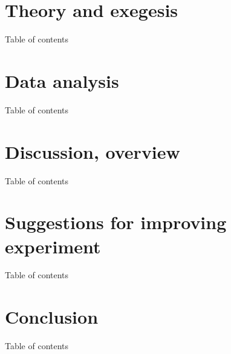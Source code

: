 \documentclass[a4paper]{beamer}
\begin{document}
	\section{Theory and exegesis}\label{sec:theory-and-exegesis}
	\begin{frame}{Table of contents}
		\tableofcontents[currentsection]
	\end{frame}
	\begin{frame}{}

	\end{frame}


	\section{Data analysis}\label{sec:data-analysis}
	\begin{frame}{Table of contents}
		\tableofcontents[currentsection]
	\end{frame}

	\begin{frame}{}

	\end{frame}


	\section{Discussion, overview}\label{sec:discussion-overview}
	\begin{frame}{Table of contents}
		\tableofcontents[currentsection]
	\end{frame}

	\begin{frame}{}

	\end{frame}


	\section{Suggestions for improving experiment}\label{sec:suggestions-for-improving-experiment}
	\begin{frame}{Table of contents}
		\tableofcontents[currentsection]
	\end{frame}

	\begin{frame}{}

	\end{frame}


	\section{Conclusion}\label{sec:conclusion}
	\begin{frame}{Table of contents}
		\tableofcontents[currentsection]
	\end{frame}

	\begin{frame}{}

	\end{frame}
\end{document}
